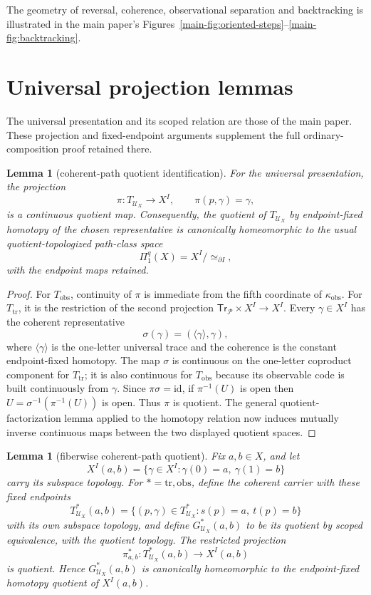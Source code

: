 \documentclass[10pt,reqno]{amsart}
\theoremstyle{definition}
\theoremstyle{plain}
\newtheorem{lemma}[definition]{Lemma}
\theoremstyle{remark}
\begin{document}
The geometry of reversal, coherence, observational separation and
backtracking is illustrated in the main paper's
Figures~\ref{main-fig:oriented-steps}--\ref{main-fig:backtracking}.

\section{Universal projection lemmas}
The universal presentation and its scoped relation are those of the main
paper. These projection and fixed-endpoint arguments supplement the full
ordinary-composition proof retained there.

\begin{lemma}[coherent-path quotient identification]
\label{lem:coherent-path-quotient-identification}
For the universal presentation, the projection
\[
  \pi:T_{\mathcal U_X}\longrightarrow X^I,
  \qquad \pi(p,\gamma)=\gamma,
\]
is a continuous quotient map.  Consequently, the quotient of
$T_{\mathcal U_X}$ by endpoint-fixed homotopy of the chosen representative is
canonically homeomorphic to the usual quotient-topologized path-class space
\[
  \Pi_1^q(X)=X^I/{\simeq_{\partial I}},
\]
with the endpoint maps retained.
\end{lemma}

\begin{proof}
For $T_{\mathrm{obs}}$, continuity of $\pi$ is immediate from the fifth
coordinate of $\kappa_{\mathrm{obs}}$.  For $T_{\mathrm{tr}}$, it is the
restriction of the second projection
$\mathsf{Tr}_{\mathcal P}\times X^I\to X^I$.  Every $\gamma\in X^I$ has the
coherent representative
\[
  \sigma(\gamma)=(\langle\gamma\rangle,\gamma),
\]
where $\langle\gamma\rangle$ is the one-letter universal trace and the
coherence is the constant endpoint-fixed homotopy.  The map $\sigma$ is
continuous on the one-letter coproduct component for $T_{\mathrm{tr}}$; it is
also continuous for $T_{\mathrm{obs}}$ because its observable code is built
continuously from $\gamma$.  Since $\pi\sigma=\mathrm{id}$, if
$\pi^{-1}(U)$ is open then
$U=\sigma^{-1}(\pi^{-1}(U))$ is open.  Thus $\pi$ is quotient.  The general quotient-factorization
lemma applied to the homotopy relation now induces mutually inverse
continuous maps between the two displayed quotient spaces.
\end{proof}

\begin{lemma}[fiberwise coherent-path quotient]
\label{lem:fiberwise-coherent-path-quotient}
Fix $a,b\in X$, and let
\[
  X^I(a,b)=\{\gamma\in X^I:\gamma(0)=a,\ \gamma(1)=b\}
\]
carry its subspace topology.  For $*=\mathrm{tr},\mathrm{obs}$, define the
coherent carrier with these fixed endpoints
\[
  T_{\mathcal U_X}^{*}(a,b)=
  \{(p,\gamma)\in T_{\mathcal U_X}^{*}:s(p)=a,\ t(p)=b\}
\]
with its own subspace topology, and define
$G_{\mathcal U_X}^{*}(a,b)$ to be its quotient by scoped equivalence, with
the quotient topology.  The restricted projection
\[
  \pi_{a,b}^{*}:T_{\mathcal U_X}^{*}(a,b)\longrightarrow X^I(a,b)
\]
is quotient.  Hence $G_{\mathcal U_X}^{*}(a,b)$ is canonically homeomorphic
to the endpoint-fixed homotopy quotient of $X^I(a,b)$.
\end{lemma}
\end{document}

